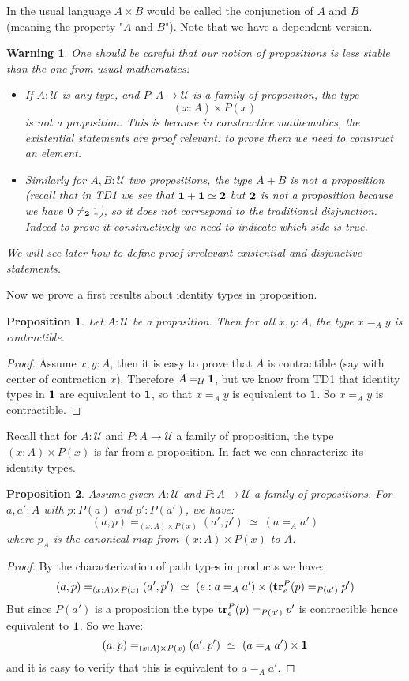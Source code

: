 \documentclass{article}
\newcommand{\U}{{\mathcal U}}
\renewcommand{\r}{\rightarrow}
\newcommand{\tr}{\mathrm{\bf tr}}
\newcommand{\one}{{\bf 1}}
\newcommand{\two}{{\bf 2}}
\newtheorem{proposition}{Proposition}
\newtheorem{warning}{\danger Warning}
\begin{document}
In the usual language $A\times B$ would be called the conjunction of $A$ and $B$ (meaning the property "$A$ and $B$"). Note that we have a dependent version.

\begin{warning}
One should be careful that our notion of propositions is less stable than the one from usual mathematics:
\begin{itemize}
\item If $A:\U$ is any type, and $P:A\r \U$ is a family of proposition, the type
\[(x:A)\times P(x)\] 
is not a proposition. This is because in constructive mathematics, the existential statements are proof relevant: to prove them we need to construct an element. 
\item Similarly for $A,B:\U$ two propositions, the type $A+B$ is not a proposition (recall that in TD1 we see that $\one+\one\simeq\two$ but $\two$ is not a proposition because we have $0\neq_{\two}1$), so it does not correspond to the traditional disjunction. Indeed to prove it constructively we need to indicate which side is true.  
\end{itemize}
We will see later how to define proof irrelevant existential and disjunctive statements.
\end{warning}

Now we prove a first results about identity types in proposition.

\begin{proposition}
Let $A:\U$ be a proposition. Then for all $x,y:A$, the type $x=_Ay$ is contractible.
\end{proposition}
\begin{proof}
Assume $x,y:A$, then it is easy to prove that $A$ is contractible (say with center of contraction $x$). Therefore $A=_\U\one$, but we know from TD1 that identity types in $\one$ are equivalent to $\one$, so that $x=_A y$ is equivalent to $\one$. So $x=_Ay$  is contractible.
\end{proof}

Recall that for $A:\U$ and $P:A\r \U$ a family of proposition, the type $(x:A)\times P(x)$ is far from a proposition. In fact we can characterize its identity types.

\begin{proposition}
Assume given $A:\U$ and $P:A\r \U$ a family of propositions. For $a,a':A$ with $p:P(a)$ and $p':P(a')$, we have:
\[(a,p)=_{(x:A)\times P(x)} (a',p')\ \simeq \ (a=_Aa')\]
where $p_A$ is the canonical map from $(x:A)\times P(x)$ to $A$.
\end{proposition}
\begin{proof}
By the characterization of path types in products we have:
\[(a,p)=_{(x:A)\times P(x)} (a',p')\ \simeq \ (e:a=_Aa')\times(\tr^P_e(p) =_{P(a')} p') \]
But since $P(a')$ is a proposition the type $\tr^P_e(p) =_{P(a')} p'$ is contractible hence equivalent to $\one$. So we have:
\[(a,p)=_{(x:A)\times P(x)} (a',p')\ \simeq \ (a=_Aa')\times \one\]
and it is easy to verify that this is equivalent to $a=_Aa'$.
\end{proof}
\end{document}
